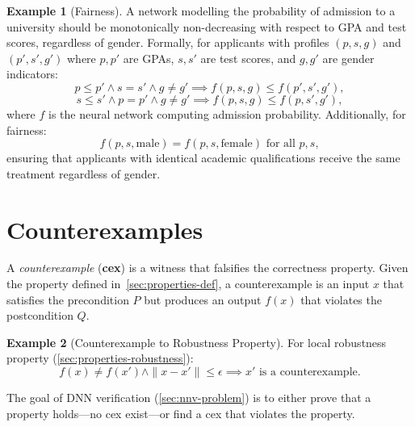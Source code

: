 \documentclass[oneside,11pt,dvipsnames]{book}
\numberwithin{equation}{section}
\theoremstyle{definition}
\newtheorem{example}{Example}[section]
\theoremstyle{remark}
\begin{document}
\begin{example}[Fairness]
    A network modelling the probability of admission to a university should be monotonically non-decreasing with respect to GPA and test scores, regardless of gender. Formally, for applicants with profiles $(p, s, g)$ and $(p', s', g')$ where $p, p'$ are GPAs, $s, s'$ are test scores, and $g, g'$ are gender indicators:
\[
p \leq p' \land s = s' \land g \neq g' \implies f(p, s, g) \leq f(p', s', g'),
\]
\[
s \leq s' \land p = p' \land g \neq g' \implies f(p, s, g) \leq f(p, s', g'),
\]
where $f$ is the neural network computing admission probability. Additionally, for fairness:
\[
f(p, s, \text{male}) = f(p, s, \text{female}) \text{ for all } p, s,
\]
ensuring that applicants with identical academic qualifications receive the same treatment regardless of gender.
\end{example}



\section{Counterexamples}\label{sec:properties-counterexamples}

A \emph{counterexample} (\textbf{cex}) is a witness that falsifies the correctness property. Given the property defined in~\autoref{sec:properties-def}, a counterexample is an input $x$ that satisfies the precondition $P$ but produces an output $f(x)$ that violates the postcondition $Q$.


\begin{example}[Counterexample to Robustness Property]
For local robustness property (\autoref{sec:properties-robustness}):
\[
f(x) \neq f(x') \land \|x - x'\| \leq \epsilon \implies x' \text{ is a counterexample.}
\]
\end{example}

The goal of DNN verification (\autoref{sec:nnv-problem}) is to either prove that a property holds---no cex exist---or find a cex that violates the property.
\end{document}
